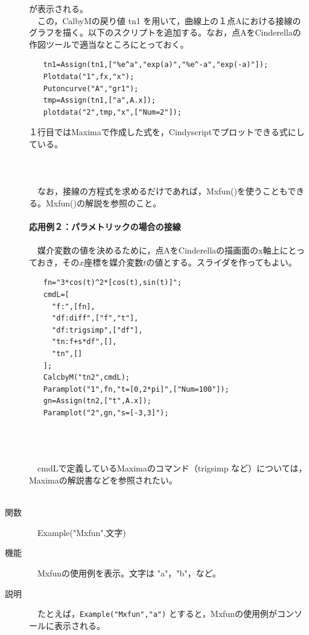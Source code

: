 \documentclass[papersize,a4paper,12pt,uplatex]{jsarticle}
\begin{document}
\begin{description}
\begin{verbatim}
\end{verbatim}
が表示される。\\
　この，CalbyMの戻り値 tn1 を用いて，曲線上の１点Aにおける接線のグラフを描く。以下のスクリプトを追加する。なお，点AをCinderellaの作図ツールで適当なところにとっておく。
\begin{verbatim}
　　tn1=Assign(tn1,["%e^a","exp(a)","%e^-a","exp(-a)"]);
　　Plotdata("1",fx,"x");
　　Putoncurve("A","gr1");
　　tmp=Assign(tn1,["a",A.x]);
　　plotdata("2",tmp,"x",["Num=2"]);
\end{verbatim}
１行目ではMaximaで作成した式を，Cindyscriptでプロットできる式にしている。\\
　\\
　　　　　　\\
　\\
　なお，接線の方程式を求めるだけであれば，Mxfun()を使うこともできる。Mxfun()の解説を参照のこと。\\
　\\
{\bf 応用例２：パラメトリックの場合の接線}\\
　\\
　媒介変数の値を決めるために，点AをCinderellaの描画面のx軸上にとっておき，その$x$座標を媒介変数$t$の値とする。スライダを作ってもよい。
\begin{verbatim}
　　fn="3*cos(t)^2*[cos(t),sin(t)]";
　　cmdL=[
　　  "f:",[fn],
　　  "df:diff",["f","t"],
　　  "df:trigsimp",["df"],
　　  "tn:f+s*df",[],
　　  "tn",[]
　　];
　　CalcbyM("tn2",cmdL);
　　Paramplot("1",fn,"t=[0,2*pi]",["Num=100"]);
　　gn=Assign(tn2,["t",A.x]);
　　Paramplot("2",gn,"s=[-3,3]");
\end{verbatim}
　\\
　　　　　　\\
　\\
　cmdLで定義しているMaximaのコマンド（trigsimp など）については，Maximaの解説書などを参照されたい。\\
　\\
\hypertarget{example}{}
\item[関数]　Example("Mxfun",文字)
\item[機能]　Mxfunの使用例を表示。文字は "a"，"b"，など。
\item[説明]　たとえば，\verb|Example("Mxfun","a")| とすると，Mxfunの使用例がコンソールに表示される。\\
　\\


\end{description}
\end{document}
